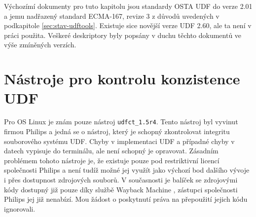 Výchozímí dokumenty pro tuto kapitolu jsou standardy OSTA UDF do verze 2.01 \cite{osta-udf-0201} a jemu nadřazený standard ECMA-167, revize 3 \cite{ecma-167} z důvodů uvedených v podkapitole \ref{sec:stav-udftools}. Existuje sice novější verze UDF 2.60, ale ta není v práci použita. Veškeré deskriptory byly popsány v duchu těchto dokumentů ve výše zmíněných verzích.


\chapter{Nástroje pro kontrolu konzistence UDF}
\label{sec:nastroje}
Pro OS Linux je znám pouze nástroj \texttt{udfct\_1.5r4}. Tento nástroj byl vyvinut firmou Philips a jedná se o nástroj, který je schopný zkontrolovat integritu souborového systému UDF. Chyby v implementaci UDF a případné chyby v datech vypisuje do terminálu, ale není schopný je opravovat. Zásadním problémem tohoto nástroje je, že existuje pouze pod restriktivní licencí společnosti Philips a není tudíž možné jej využít jako výchozí bod dalšího vývoje i přes dostupnost zdrojových souborů. V současnosti je balíček se zdrojovými kódy dostupný již pouze díky službě Wayback Machine \cite{wayback}, zástupci společnosti Philips jej již nenabízí. Mou žádost o poskytnutí práva na přepoužití jejich kódu ignorovali.

